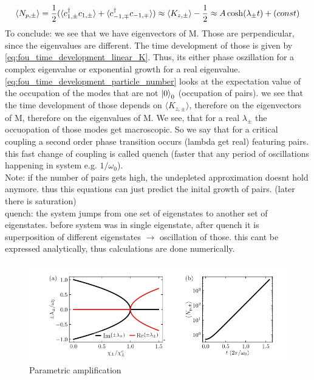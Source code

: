 \begin{equation}\label{eq:fou_time_development_particle_number}
	\langle N_{p,\pm} \rangle = \frac{1}{2} (\langle c_{1,\pm}^\dag c_{1,\pm} \rangle + \langle c_{-1,\mp}^\dag c_{-1,\mp}\rangle ) \approx \langle K_{z,\pm} \rangle - \frac{1}{2} \approx A\cosh(\lambda_\pm t) + \text(const)
\end{equation}
To conclude: we see that we have eigenvectors of M. Those are perpendicular, since the eigenvalues are different. The time development of those is given by \ref{eq:fou_time_development_linear_K}. Thus, its either phase oszillation for a complex eigenvalue or exponential growth for a real eigenvalue. \ref{eq:fou_time_development_particle_number} looks at the expectation value of the occupation of the modes that are not $\ket{0}_0$ (occupation of pairs). we see that the time development of those depends on $ \langle K_{z,\pm} \rangle$, therefore on the eigenvectors of M, therefore on the eigenvalues of M. We see, that for a real $\lambda_\pm$ the occuopation of those modes get macroscopic. So we say that for a critical coupling a second order phase transition occurs (lambda get real) featuring pairs. this fast change of coupling is called quench (faster that any period of oscillations happening in system e.g. $1/\omega_0$). 
\\
Note: if the number of pairs gets high, the undepleted approximation doesnt hold anymore. thus this equations can just predict the inital growth of pairs. (later there is saturation)
\\
quench: the system jumps from one set of eigenstates to another set of eigenstates. before system was in single eigenstate, after quench it is superposition of different eigenstates $\rightarrow$ oscillation of those. this cant be expressed analytically, thus calculations are done numerically. 
\begin{figure}[h!]
	\centering
	\includegraphics[width=1\linewidth]{Images/scetch_quench_parametric_amplification.png}
	\caption{Parametric amplification}
	\label{fig:scetch_quench_parametric_amplification}
\end{figure}
